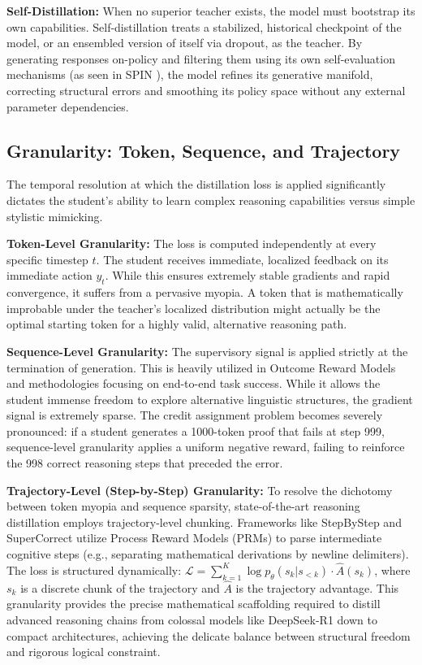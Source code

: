 \documentclass{article} %
\newcommand{\ptheta}{p_\theta}
\newcommand{\loss}{\mathcal{L}}
\begin{document}
\textbf{Self-Distillation:} When no superior teacher exists, the model must bootstrap its own capabilities. Self-distillation treats a stabilized, historical checkpoint of the model, or an ensembled version of itself via dropout, as the teacher. By generating responses on-policy and filtering them using its own self-evaluation mechanisms (as seen in SPIN \citep{2401.01335}), the model refines its generative manifold, correcting structural errors and smoothing its policy space without any external parameter dependencies.

\subsection{Granularity: Token, Sequence, and Trajectory}
\label{subsec:tax_granularity}

The temporal resolution at which the distillation loss is applied significantly dictates the student's ability to learn complex reasoning capabilities versus simple stylistic mimicking.

\textbf{Token-Level Granularity:} The loss is computed independently at every specific timestep $t$. The student receives immediate, localized feedback on its immediate action $y_t$. While this ensures extremely stable gradients and rapid convergence, it suffers from a pervasive myopia. A token that is mathematically improbable under the teacher's localized distribution might actually be the optimal starting token for a highly valid, alternative reasoning path.

\textbf{Sequence-Level Granularity:} The supervisory signal is applied strictly at the termination of generation. This is heavily utilized in Outcome Reward Models and methodologies focusing on end-to-end task success. While it allows the student immense freedom to explore alternative linguistic structures, the gradient signal is extremely sparse. The credit assignment problem becomes severely pronounced: if a student generates a 1000-token proof that fails at step 999, sequence-level granularity applies a uniform negative reward, failing to reinforce the 998 correct reasoning steps that preceded the error.

\textbf{Trajectory-Level (Step-by-Step) Granularity:} To resolve the dichotomy between token myopia and sequence sparsity, state-of-the-art reasoning distillation employs trajectory-level chunking. Frameworks like StepByStep \citep{2305.02301} and SuperCorrect \citep{2410.09008} utilize Process Reward Models (PRMs) \citep{2305.20050} to parse intermediate cognitive steps (e.g., separating mathematical derivations by newline delimiters). The loss is structured dynamically: $\loss = \sum_{k=1}^K \log \ptheta(s_k | s_{<k}) \cdot \hat{A}(s_k)$, where $s_k$ is a discrete chunk of the trajectory and $\hat{A}$ is the trajectory advantage. This granularity provides the precise mathematical scaffolding required to distill advanced reasoning chains from colossal models like DeepSeek-R1 down to compact architectures, achieving the delicate balance between structural freedom and rigorous logical constraint.
\end{document}
